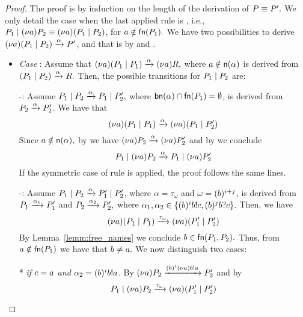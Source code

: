 \begin{proof}
The proof is by induction on the length of the derivation of $P\equiv P'.$ 
We only detail the case when the last applied rule is , i.e., $P_1\;|\;(\nu a)P_2\equiv(\nu a)(P_1\;|\;P_2)$, for $a\notin\mathsf{fn}(P_1).$ 
We have two possibilities to derive $(\nu a)(P_1\;|\;P_2)\xrightarrow{\alpha}P'$, and that is by  and .
\begin{itemize}
\item \emph{Case} : Assume that $(\nu a)(P_1\;|\;P_1)\xrightarrow{\alpha} (\nu a)R,$ where $a\notin\mathsf{n}(\alpha)$ is derived from $(P_1\;|\;P_2)\xrightarrow{\alpha} R.$ Then, the possible transitions for $P_1\;|\;P_2$ are:
	
	-: Assume $P_1\;|\;P_2\xrightarrow{\alpha}P_1\;|\;P_2',$ where $\mathsf{bn}(\alpha)\cap\mathsf{fn}(P_1)=\emptyset$, is derived from $P_2\xrightarrow{\alpha}P_2'$. We have that  
	\[
	(\nu a)(P_1\;|\;P_1)\xrightarrow{\alpha} (\nu a)(P_1 \;|\; P_2')
	\]
	Since $a\notin\mathsf{n}(\alpha),$ by  we have $(\nu a)P_2\xrightarrow{\alpha}(\nu a)P_2'$ and by we conclude  
	\[
	P_1\;|\;(\nu a)P_2\xrightarrow{\alpha}P_1\;|\;(\nu a)P_2'
	\]
	If the symmetric case of rule  is applied, the proof follows the same lines. %
	
	-: Assume $P_1\;|\;P_2\xrightarrow{\alpha}P_1'\;|\;P_2'$, where $\alpha=\tau_{\omega}$ and $\omega=(b)^{i+j}$, is derived from $P_1\xrightarrow{\alpha_1}P_1'$ and $P_2\xrightarrow{\alpha_2}P_2',$ where $\alpha_1,\alpha_2\in\{(b)^ib!c, (b)^jb?c\}.$ Then, we have
	\[
	(\nu a)(P_1\;|\;P_1)\xrightarrow{\tau_\omega} (\nu a)(P_1' \;|\; P_2')
	\]
	By Lemma~\ref{lemm:free_names} we conclude $b\in\mathsf{fn}(P_1,P_2).$ Thus, from $a\notin\mathsf{fn}(P_1)$ we have that $b\not=a.$ We now distinguish two cases:
		
		 * \emph{if $c=a$ and  $\alpha_2=(b)^ib!a$}. By  $(\nu a)P_2\xrightarrow{{(b)^i(\nu a)b!a}}P_2'$ and by  
		 \[
		 P_1\;|\;(\nu a)P_2\xrightarrow{\tau_\omega}(\nu a)(P_1'\;|\;P_2')
		 \]
		

\end{itemize}
\end{proof}
